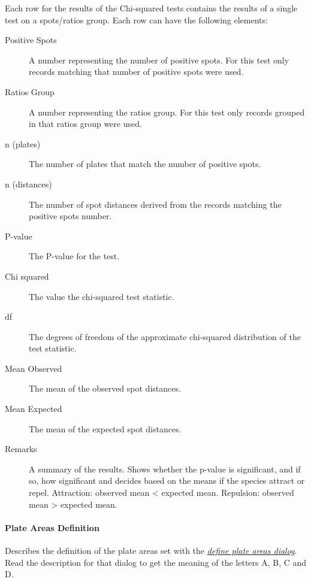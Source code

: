 \documentclass[letterpaper,10pt,english]{sphinxmanual}
\begin{document}
Each row for the results of the Chi-squared tests contains the results
of a single test on a spots/ratios group. Each row can have the
following elements:
\begin{description}
\item[{Positive Spots}] \leavevmode
A number representing the number of positive spots. For this test
only records matching that number of positive spots were used.

\item[{Ratios Group}] \leavevmode
A number representing the ratios group. For this test
only records grouped in that ratios group were used.

\item[{n (plates)}] \leavevmode
The number of plates that match the number of positive spots.

\item[{n (distances)}] \leavevmode
The number of spot distances derived from the records matching the
positive spots number.

\item[{P-value}] \leavevmode
The P-value for the test.

\item[{Chi squared}] \leavevmode
The value the chi-squared test statistic.

\item[{df}] \leavevmode
The degrees of freedom of the approximate chi-squared distribution
of the test statistic.

\item[{Mean Observed}] \leavevmode
The mean of the observed spot distances.

\item[{Mean Expected}] \leavevmode
The mean of the expected spot distances.

\item[{Remarks}] \leavevmode
A summary of the results. Shows whether the p-value is significant,
and if so, how significant and decides based on the means if the
species attract or repel.
Attraction: observed mean \textless{} expected mean.
Repulsion: observed mean \textgreater{} expected mean.

\end{description}


\paragraph{Plate Areas Definition}
\label{user_manual:plate-areas-definition}
Describes the definition of the plate areas set with the
{\hyperref[user_manual:dialog-define-plate-areas]{\emph{define plate areas dialog}}}. Read the
description for that dialog to get the meaning of the letters A, B, C
and D.
\end{document}
